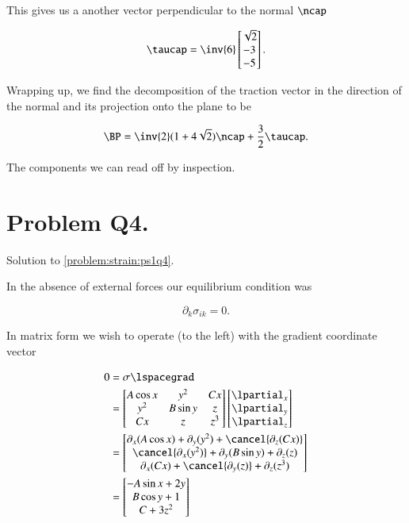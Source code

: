 This gives us a another vector perpendicular to the normal $\ncap$

\begin{equation}\label{eqn:continuumProblemSet1:490}
\taucap = 
\inv{6}
\begin{bmatrix}
\sqrt{2} \\
-3 \\
-5
\end{bmatrix}.
\end{equation}

Wrapping up, we find the decomposition of the traction vector in the direction of the normal and its projection onto the plane to be

\begin{equation}\label{eqn:continuumProblemSet1:510}
\BP 
= 
\inv{2}(1 + 4\sqrt{2}) \ncap
+
\frac{3}{2} \taucap.
\end{equation}

The components we can read off by inspection.

\label{solutions:ps1q4}
\section{Problem Q4.}

Solution to \ref{problem:strain:ps1q4}.

In the absence of external forces our equilibrium condition was

\begin{equation}\label{eqn:continuumProblemSet1:530}
\partial_k \sigma_{ik} = 0.
\end{equation}

In matrix form we wish to operate (to the left) with the gradient coordinate vector

\begin{align*}
0 
&= \sigma \lspacegrad \\
&=
\begin{bmatrix}
A \cos x & y^2 & C x \\
y^2 & B \sin y & z \\
C x & z & z^3
\end{bmatrix}
\begin{bmatrix}
\lpartial_x \\
\lpartial_y \\
\lpartial_z \\
\end{bmatrix} \\
&=
\begin{bmatrix}
\partial_x (A \cos x) + \partial_y(y^2) + \cancel{\partial_z(C x)} \\
\cancel{\partial_x (y^2)} + \partial_y(B \sin y) + \partial_z(z) \\
\partial_x (C x) + \cancel{\partial_y(z)} + \partial_z(z^3)
\end{bmatrix} \\
&=
\begin{bmatrix}
-A \sin x + 2 y \\
B \cos y + 1 \\
C + 3 z^2 
\end{bmatrix} \\
\end{align*}

